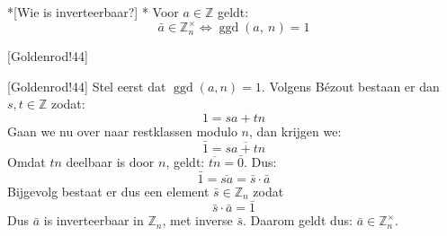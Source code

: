 \begin{nicetheorem}*[Wie is inverteerbaar?]
    \nextpart[]*
    Voor $a \in \mathbb{Z}$ geldt:
    \begin{equation*}
        \bar{a} \in \mathbb{Z}_n^{\times} \iff \operatorname{ggd}(a,\ n) = 1
    \end{equation*}
\end{nicetheorem}

[Goldenrod!44] 

\inlinetext{$\Leftarrow$}[Goldenrod!44] Stel eerst dat $\operatorname{ggd}(a,n)=1$. Volgens Bézout bestaan er dan $s,t \in \mathbb{Z}$ zodat:
\begin{equation*}
    1 = sa + tn
\end{equation*} 
Gaan we nu over naar restklassen modulo $n$, dan krijgen we:
\begin{equation*}
    \bar{1} = \overline{sa + tn}
\end{equation*}
Omdat $tn$ deelbaar is door $n$, geldt: $\overline{tn} = \bar{0}$. Dus:
\begin{equation*}
    \bar{1} = \overline{sa} = \bar{s} \cdot \bar{a}
\end{equation*}
Bijgevolg bestaat er dus een element $\bar{s} \in \mathbb{Z}_n$ zodat
\begin{equation*}
    \bar{s} \cdot \bar{a} = \bar{1}
\end{equation*}
Dus $\bar{a}$ is inverteerbaar in $\mathbb{Z}_n$, met inverse $\bar{s}$. Daarom geldt dus: $\bar{a} \in \mathbb{Z}_n^{\times}$.

